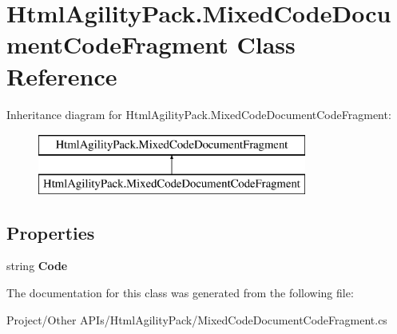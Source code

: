 \hypertarget{class_html_agility_pack_1_1_mixed_code_document_code_fragment}{}\section{Html\+Agility\+Pack.\+Mixed\+Code\+Document\+Code\+Fragment Class Reference}
\label{class_html_agility_pack_1_1_mixed_code_document_code_fragment}
Inheritance diagram for Html\+Agility\+Pack.\+Mixed\+Code\+Document\+Code\+Fragment\+:\begin{figure}[H]
\begin{center}
\leavevmode
\includegraphics[height=2.000000cm]{class_html_agility_pack_1_1_mixed_code_document_code_fragment}
\end{center}
\end{figure}
\subsection*{Properties}
\begin{DoxyCompactItemize}
\item 
\mbox{\label{class_html_agility_pack_1_1_mixed_code_document_code_fragment_a2bb5d78b24b15aa76b540bca5284b357}} 
string {\bfseries Code}
\end{DoxyCompactItemize}


The documentation for this class was generated from the following file\+:\begin{DoxyCompactItemize}
\item 
Project/\+Other A\+P\+Is/\+Html\+Agility\+Pack/Mixed\+Code\+Document\+Code\+Fragment.\+cs\end{DoxyCompactItemize}
